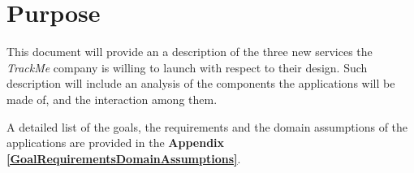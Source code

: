 \section{Purpose}

This document will provide an a description of the three new services the \emph{TrackMe} company is willing to launch with respect to their design. Such description will include an analysis of the components the applications will be made of, and the interaction among them.

A detailed list of the goals, the requirements and the domain assumptions of the applications are provided in the \textbf{Appendix \ref{GoalRequirementsDomainAssumptions}}. 
